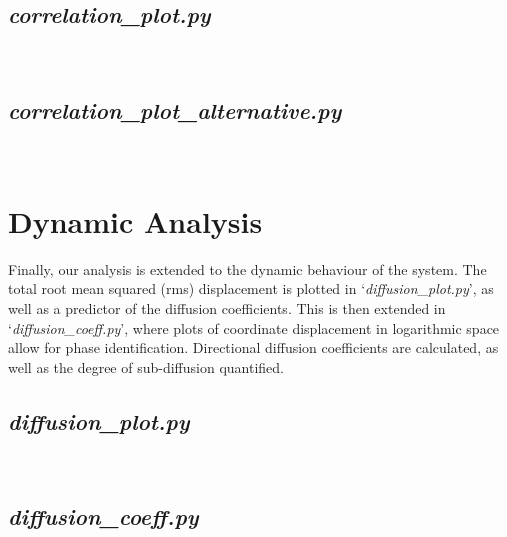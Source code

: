 \documentclass[11pt,a4paper]{article}
\begin{document}
\subsection{\textit{correlation\_plot.py}}
 \mbox{}\\

\subsection{\textit{correlation\_plot\_alternative.py}}
 \mbox{}\\


\section{Dynamic Analysis}
Finally, our analysis is extended to the dynamic behaviour of the system. The total root mean squared (rms) displacement is plotted in `\textit{diffusion\_plot.py}', as well as a predictor of the diffusion coefficients. This is then extended in `\textit{diffusion\_coeff.py}', where plots of coordinate displacement in logarithmic space allow for phase identification. Directional diffusion coefficients are calculated, as well as the degree of sub-diffusion quantified.

\subsection{\textit{diffusion\_plot.py}}
 \mbox{}\\

\subsection{\textit{diffusion\_coeff.py}}
 \mbox{}\\
\end{document}
